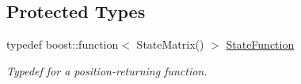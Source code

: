 \subsection*{Protected Types}
\begin{DoxyCompactItemize}
\item 
typedef boost\+::function$<$ State\+Matrix() $>$ \hyperlink{classtudat_1_1gravitation_1_1SphericalHarmonicsGravitationalAccelerationModelBase_a4ca706c4f941be481fc5f490e49390d8}{State\+Function}\hypertarget{classtudat_1_1gravitation_1_1SphericalHarmonicsGravitationalAccelerationModelBase_a4ca706c4f941be481fc5f490e49390d8}{}\label{classtudat_1_1gravitation_1_1SphericalHarmonicsGravitationalAccelerationModelBase_a4ca706c4f941be481fc5f490e49390d8}

\begin{DoxyCompactList}\small\item\em Typedef for a position-\/returning function. \end{DoxyCompactList}\end{DoxyCompactItemize}
